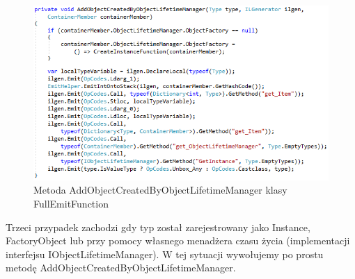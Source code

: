 \documentclass[12pt]{article}
\begin{document}
\begin{figure}[h]
	\begin{center}
  		\includegraphics{FullEmitFunction_AddObjectCreatedByObjectLifetimeManager.png}
  		\caption{Metoda AddObjectCreatedByObjectLifetimeManager klasy FullEmitFunction}
  		\label{fig:FullEmitFunction_AddObjectCreatedByObjectLifetimeManager}
	\end{center}
\end{figure}

Trzeci przypadek zachodzi gdy typ został zarejestrowany jako Instance, FactoryObject lub przy pomocy własnego menadżera czasu życia (implementacji interfejsu IObjectLifetimeManager). W tej sytuacji wywołujemy po prostu metodę AddObjectCreatedByObjectLifetimeManager.



\clearpage
\end{document}
